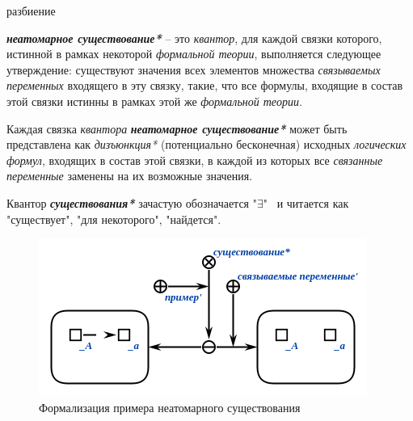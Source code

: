 \begin{SCn}
\begin{scnreltoset}{разбиение}
\end{scnreltoset}

\end{SCn}

\textbf{\textit{неатомарное существование*}} -- это \textit{квантор}, для каждой связки которого, истинной в рамках некоторой \textit{формальной теории}, выполняется следующее утверждение: существуют значения всех элементов множества \textit{связываемых переменных\scnrolesign} входящего в эту связку, такие, что все формулы, входящие в состав этой связки истинны в рамках этой же \textit{формальной теории}.

Каждая связка \textit{квантора} \textbf{\textit{неатомарное существование*}} может быть представлена как \textit{дизъюнкция*} (потенциально бесконечная) исходных \textit{логических формул}, входящих в состав этой связки, в каждой из которых все \textit{связанные переменные\scnrolesign} заменены на их возможные значения.

Квантор \textbf{\textit{существования*}} зачастую обозначается "$\exists$" \ и читается как "существует"{}, "для некоторого"{}, "найдется".

\begin{figure}[http]
\includegraphics[scale=0.8]{author/part2/figures/logic/non_atomicExistence.png}
\caption{Формализация примера неатомарного существования}
\label{fig:non_atomic_existence}
\end{figure}

\begin{SCn}
\end{SCn}

